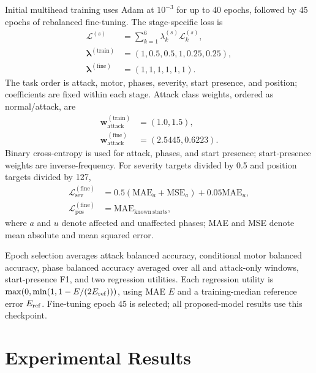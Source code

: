 \documentclass[conference,letterpaper]{IEEEtran}
\begin{document}
Initial multihead training uses Adam at $10^{-3}$ for up to 40 epochs, followed by 45 epochs of rebalanced fine-tuning. The stage-specific loss is
\begin{equation}
\begin{aligned}
\mathcal{L}^{(s)} &= \sum_{k=1}^{6}\lambda_k^{(s)}\mathcal{L}_k^{(s)},\\
\boldsymbol{\lambda}^{(\mathrm{train})} &= (1,0.5,0.5,1,0.25,0.25),\\
\boldsymbol{\lambda}^{(\mathrm{fine})} &= (1,1,1,1,1,1).
\end{aligned}
\label{eq:multitask_loss}
\end{equation}
The task order is attack, motor, phases, severity, start presence, and position; coefficients are fixed within each stage. Attack class weights, ordered as normal/attack, are
\begin{equation}
\begin{aligned}
\mathbf{w}_{\mathrm{attack}}^{(\mathrm{train})} &= (1.0,1.5),\\
\mathbf{w}_{\mathrm{attack}}^{(\mathrm{fine})} &= (2.5445,0.6223).
\end{aligned}
\label{eq:attack_weights}
\end{equation}
Binary cross-entropy is used for attack, phases, and start presence; start-presence weights are inverse-frequency. For severity targets divided by 0.5 and position targets divided by 127,
\begin{equation}
\begin{aligned}
\mathcal{L}_{\mathrm{sev}}^{(\mathrm{fine})} &= 0.5(\mathrm{MAE}_{a}+\mathrm{MSE}_{a})+0.05\mathrm{MAE}_{u},\\
\mathcal{L}_{\mathrm{pos}}^{(\mathrm{fine})} &= \mathrm{MAE}_{\mathrm{known\ starts}},
\end{aligned}
\end{equation}
where $a$ and $u$ denote affected and unaffected phases; MAE and MSE denote mean absolute and mean squared error.

Epoch selection averages attack balanced accuracy, conditional motor balanced accuracy, phase balanced accuracy averaged over all and attack-only windows, start-presence F1, and two regression utilities. Each regression utility is $\max(0,\min(1,1-E/(2E_{\rm ref})))$, using MAE $E$ and a training-median reference error $E_{\rm ref}$. Fine-tuning epoch 45 is selected; all proposed-model results use this checkpoint.



\section{Experimental Results}
\end{document}
